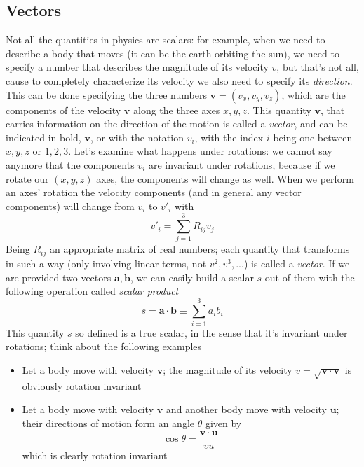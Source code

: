 \documentclass[11pt, a4paper,oneside,openright]{book}
\numberwithin{equation}{section}
\begin{document}
\subsection{Vectors}
Not all the quantities in physics are scalars: for example, when we need to describe a body that moves (it can be the earth orbiting the sun), we need to specify a number that describes the magnitude of its velocity $v$, but that's not all, cause to completely characterize its velocity we also need to specify its \textit{direction}. This can be done specifying the three numbers $\mathbf{v}=(v_x,v_y,v_z)$, which are the components of the velocity $\mathbf{v}$ along the three axes $x,y,z$. This quantity $\mathbf{v}$, that carries information on the direction of the motion is called a \textit{vector}, and can be indicated in bold, $\mathbf{v}$, or with the notation $v_i$, with the index $i$ being one between $x,y,z$ or $1,2,3$. Let's examine what happens under rotations: we cannot say anymore that the components $v_i$ are invariant under rotations, because if we rotate our $(x,y,z)$ axes, the components will change as well. When we perform an axes' rotation the velocity components (and in general any vector 
components) will change from $v_i$ to $v'_i$ with
\begin{equation}
v'_i=\sum_{j=1}^3R_{ij}v_j
\end{equation}
Being $R_{ij}$ an appropriate matrix of real numbers; each quantity that transforms in such a way (only involving linear terms, not $v^2,v^3,...$) is called a \textit{vector}. If we are provided two vectors $\mathbf{a},\mathbf{b}$, we can easily build a scalar $s$ out of them with the following operation called \textit{scalar product}
\begin{equation}
\label{scalarprod}
s=\mathbf{a}\cdot\mathbf{b}\equiv \sum_{i=1}^3a_ib_i
\end{equation}
This quantity $s$ so defined is a true scalar, in the sense that it's invariant under rotations; think about the following examples
\begin{itemize}
\item Let a body move with velocity $\mathbf{v}$; the magnitude of its velocity $v=\sqrt{\mathbf{v}\cdot{\mathbf{v}}}$ is obviously rotation invariant
\item Let a body move with velocity $\mathbf{v}$ and another body move with velocity $\mathbf{u}$; their directions of motion form an angle $\theta$ given by
\begin{equation}
\cos{\theta}=\frac{\mathbf{v}\cdot\mathbf{u}}{vu}
\end{equation}
which is clearly rotation invariant
\end{itemize}
\end{document}
